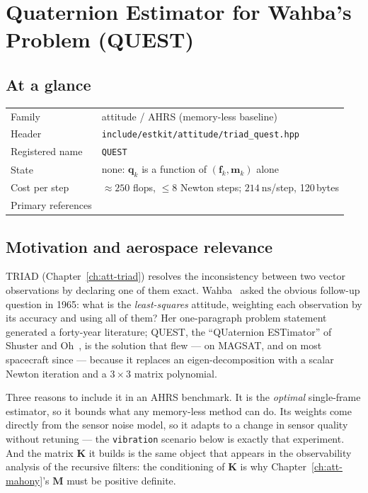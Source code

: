 \chapter{Quaternion Estimator for Wahba's Problem (QUEST)}
\label{ch:att-quest}

\section*{At a glance}
\begin{tabular}{@{}l>{\raggedright\arraybackslash}p{}@{}}
Family & attitude / AHRS (memory-less baseline) \\
Header & \texttt{include/estkit/attitude/triad\_quest.hpp} \\
Registered name & \texttt{QUEST} \\
State & none: $\bm{q}_k$ is a function of $(\bm{f}_k,\bm{m}_k)$ alone \\
Cost per step & $\approx250$ flops, $\le8$ Newton steps;
  $\SI{214}{\nano\second}$/step, 120\,bytes \\
Primary references & \cite{wahba1965,shusteroh1981,markleymortari2000,keat1977} \\
\end{tabular}

\section{Motivation and aerospace relevance}
TRIAD (Chapter~\ref{ch:att-triad}) resolves the inconsistency between two vector observations by
declaring one of them exact. Wahba~\cite{wahba1965} asked the obvious follow-up question in 1965:
what is the \emph{least-squares} attitude, weighting each observation by its accuracy and using all
of them? Her one-paragraph problem statement generated a forty-year literature; QUEST, the
``QUaternion ESTimator'' of Shuster and Oh~\cite{shusteroh1981}, is the solution that flew --- on
MAGSAT, and on most spacecraft since --- because it replaces an eigen-decomposition with a
scalar Newton iteration and a $3\times3$ matrix polynomial.

Three reasons to include it in an AHRS benchmark. It is the \emph{optimal} single-frame estimator,
so it bounds what any memory-less method can do. Its weights come directly from the sensor noise
model, so it adapts to a change in sensor quality without retuning --- the \texttt{vibration}
scenario below is exactly that experiment. And the matrix $\bm{K}$ it builds is the same object that
appears in the observability analysis of the recursive filters: the conditioning of $\bm{K}$ is why
Chapter~\ref{ch:att-mahony}'s $\bm{M}$ must be positive definite.

